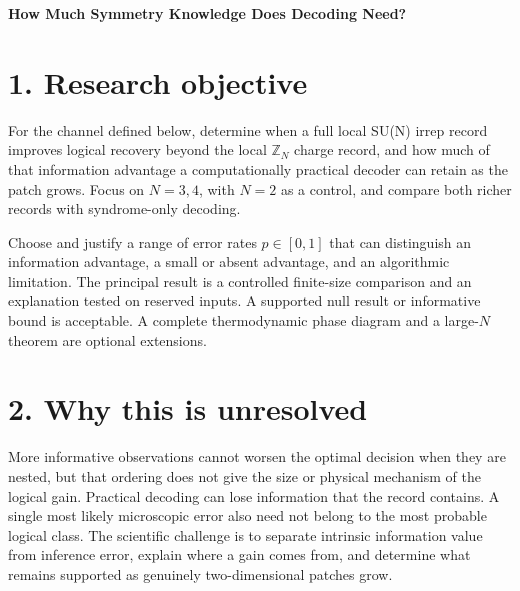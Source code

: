 \documentclass[11pt,letterpaper]{article}
\begin{document}
\fontsize{10.5}{12.7}\selectfont
{\raggedright{}\fontsize{24}{28}\selectfont\sffamily\bfseries How Much Symmetry Knowledge Does Decoding Need?\par}


\vspace{8pt}

\section*{1. Research objective}

For the channel defined below, determine when a full local SU(N) irrep record improves logical recovery beyond the local $\mathbb Z_N$ charge record, and how much of that information advantage a computationally practical decoder can retain as the patch grows. Focus on $N=3,4$, with $N=2$ as a control, and compare both richer records with syndrome-only decoding.\par

Choose and justify a range of error rates $p\in[0,1]$ that can distinguish an information advantage, a small or absent advantage, and an algorithmic limitation. The principal result is a controlled finite-size comparison and an explanation tested on reserved inputs. A supported null result or informative bound is acceptable. A complete thermodynamic phase diagram and a large-$N$ theorem are optional extensions.\par

\section*{2. Why this is unresolved}

More informative observations cannot worsen the optimal decision when they are nested, but that ordering does not give the size or physical mechanism of the logical gain. Practical decoding can lose information that the record contains. A single most likely microscopic error also need not belong to the most probable logical class. The scientific challenge is to separate intrinsic information value from inference error, explain where a gain comes from, and determine what remains supported as genuinely two-dimensional patches grow.\par
\end{document}
